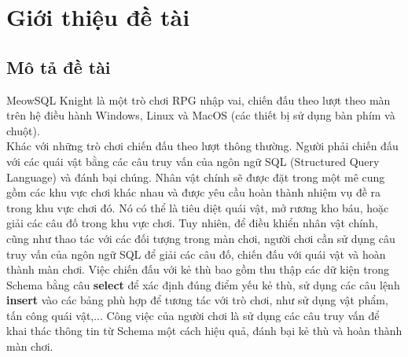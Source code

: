 \section{Giới thiệu đề tài}
\subsection{Mô tả đề tài}
	\hspace*{1cm} MeowSQL Knight là một trò chơi RPG nhập vai, chiến đấu theo lượt theo màn trên hệ điều hành Windows, Linux và MacOS (các thiết bị sử dụng bàn phím và chuột).\\
	\hspace*{1cm} Khác với những trò chơi chiến đấu theo lượt thông thường. Người phải chiến đấu với các quái vật bằng các câu truy vấn của ngôn ngữ SQL (Structured Query Language) và đánh bại chúng. Nhân vật chính sẽ được đặt trong một mê cung gồm các khu vực chơi khác nhau và được yêu cầu hoàn thành nhiệm vụ đề ra trong khu vực chơi đó. Nó có thể là tiêu diệt quái vật, mở rương kho báu, hoặc giải các câu đố trong khu vực chơi. Tuy nhiên, để
	điều khiển nhân vật chính, cũng như thao tác với các đối tượng trong màn chơi, người chơi cần sử dụng câu truy vấn của ngôn ngữ SQL để giải các câu đố, chiến đấu với quái vật và hoàn thành màn chơi. Việc chiến đấu với kẻ thù bao gồm thu thập các dữ kiện trong Schema bằng câu \textbf{select} để xác định đúng điểm yếu kẻ thù, sử dụng các câu lệnh \textbf{insert} vào các bảng phù hợp để tương tác với trò chơi, như sử dụng vật phẩm, tấn công quái vật,...  Công việc của người chơi là sử dụng các câu truy vấn để khai thác thông tin từ Schema một cách hiệu quả, đánh bại kẻ thù và hoàn thành màn chơi.
	 
